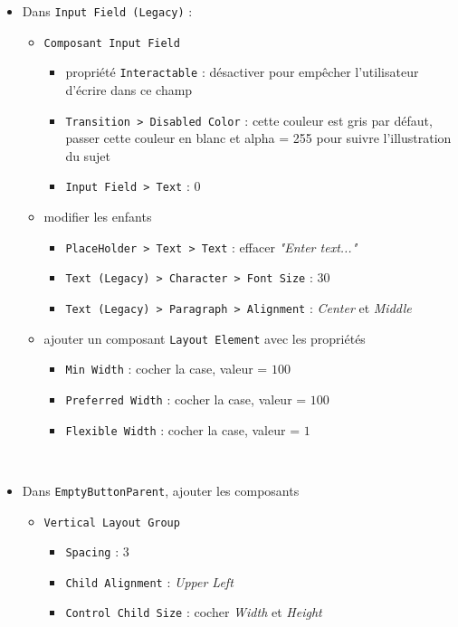 \documentclass[a4paper,10pt]{article}
\newenvironment{solution}%
{\begin{tcolorbox}[breakable,colback=red!5!white,colframe=red!75!black,title=Solution]}%
{\end{tcolorbox}}
\begin{document}
\begin{solution}
\begin{itemize}
	\item Dans \texttt{Input Field (Legacy)} :
	\begin{itemize}
		\item \texttt{Composant Input Field}
		\begin{itemize}
			\item propriété \texttt{Interactable} : désactiver pour empêcher l'utilisateur d'écrire dans ce champ
			\item \texttt{Transition > Disabled Color} : cette couleur est gris par défaut, passer cette couleur en blanc et alpha = 255 pour suivre l'illustration du sujet
			\item \texttt{Input Field > Text} : $0$
		\end{itemize}
		\item modifier les enfants
		\begin{itemize}						
			\item \texttt{PlaceHolder > Text > Text} : effacer \textit{"Enter text..."}
			\item \texttt{Text (Legacy) > Character > Font Size} : $30$
			\item \texttt{Text (Legacy) > Paragraph > Alignment} : \textit{Center} et \textit{Middle}
		\end{itemize}		

		\item ajouter un composant \texttt{Layout Element} avec les propriétés
		\begin{itemize}			
			\item \texttt{Min Width} : cocher la case, valeur = $100$
			\item \texttt{Preferred Width} : cocher la case, valeur = $100$
			\item \texttt{Flexible Width} : cocher la case, valeur = $1$
		\end{itemize}	
	\end{itemize}		
	
	 \item Dans \texttt{EmptyButtonParent}, 	ajouter les composants
		\begin{itemize}				
			\item	\texttt{Vertical Layout Group}
			\begin{itemize}
				\item \texttt{Spacing} : $3$
				\item \texttt{Child Alignment} : \textit{Upper Left}
				\item \texttt{Control Child Size} : cocher \textit{Width} et \textit{Height}
				

\end{itemize}
\end{itemize}
\end{itemize}
\end{solution}
\end{document}
